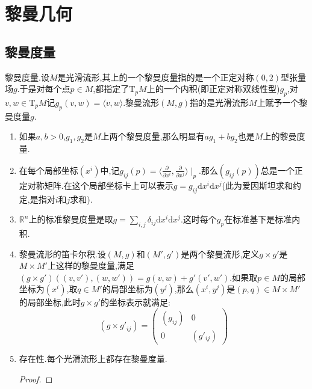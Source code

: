 \newpage
\chapter{黎曼几何}
\section{黎曼度量}

黎曼度量.设$M$是光滑流形,其上的一个黎曼度量指的是一个正定对称$(0,2)$型张量场$g$.于是对每个点$p\in M$,都指定了$\mathrm{T}_pM$上的一个内积(即正定对称双线性型)$g_p$,对$v,w\in\mathrm{T}_pM$记$g_p(v,w)=\langle v,w\rangle$.黎曼流形$(M,g)$指的是光滑流形$M$上赋予一个黎曼度量$g$.
\begin{enumerate}
	\item 如果$a,b>0$,$g_1,g_2$是$M$上两个黎曼度量,那么明显有$ag_1+bg_2$也是$M$上的黎曼度量.
	\item 在每个局部坐标$(x^i)$中,记$g_{ij}(p)=\langle\frac{\partial}{\partial x^i},\frac{\partial}{\partial x^j}\rangle\mid_p$.那么$(g_{ij}(p))$总是一个正定对称矩阵.在这个局部坐标卡上可以表示$g=g_{ij}\mathrm{d}x^i\mathrm{d}x^j$(此为爱因斯坦求和约定,是指对$i$和$j$求和).
	\item $\mathbb{R}^n$上的标准黎曼度量是取$g=\sum_{i,j}\delta_{ij}\mathrm{d}x^i\mathrm{d}x^j$.这时每个$g_p$在标准基下是标准内积.
	\item 黎曼流形的笛卡尔积.设$(M,g)$和$(M',g')$是两个黎曼流形,定义$g\times g'$是$M\times M'$上这样的黎曼度量,满足$(g\times g')((v,v'),(w,w'))=g(v,w)+g'(v',w')$.如果取$p\in M$的局部坐标为$(x^i)$,取$q\in M'$的局部坐标为$(y^j)$,那么$(x^i,y^j)$是$(p,q)\in M\times M'$的局部坐标,此时$g\times g'$的坐标表示就满足:
	$$\left(g\times g'_{ij}\right)=\left(\begin{array}{cc}(g_{ij})&0\\0&(g'_{ij})\end{array}\right)$$
	\item 存在性.每个光滑流形上都存在黎曼度量.
	\begin{proof}
		

\end{proof}
\end{enumerate}
